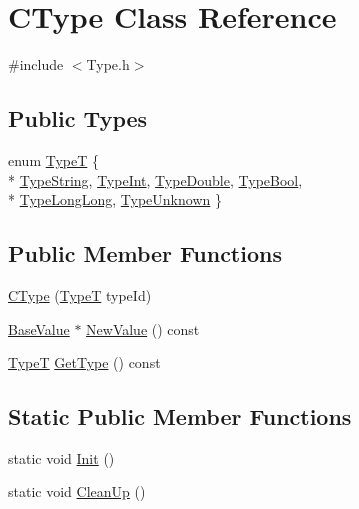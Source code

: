 \hypertarget{class_c_type}{}\section{C\+Type Class Reference}
\label{class_c_type}


{\ttfamily \#include $<$Type.\+h$>$}

\subsection*{Public Types}
\begin{DoxyCompactItemize}
\item 
enum \hyperlink{class_c_type_accfff8ca293dba5cbd8a2d677cf6afa8}{Type\+T} \{ \\*
\hyperlink{class_c_type_accfff8ca293dba5cbd8a2d677cf6afa8a32dc6836df63bbf4807060e818f3da44}{Type\+String}, 
\hyperlink{class_c_type_accfff8ca293dba5cbd8a2d677cf6afa8a874281da0d6532ec4227d4da1fa76af6}{Type\+Int}, 
\hyperlink{class_c_type_accfff8ca293dba5cbd8a2d677cf6afa8a49eebda7b46165589876f59f2afd97f3}{Type\+Double}, 
\hyperlink{class_c_type_accfff8ca293dba5cbd8a2d677cf6afa8a1606018c0364dff12aa35ffb5d8a3bca}{Type\+Bool}, 
\\*
\hyperlink{class_c_type_accfff8ca293dba5cbd8a2d677cf6afa8adf9dba82ab56f4fe11cc370139e69243}{Type\+Long\+Long}, 
\hyperlink{class_c_type_accfff8ca293dba5cbd8a2d677cf6afa8a3b3c7e2f3e8940bf90120c5344062e60}{Type\+Unknown}
 \}
\end{DoxyCompactItemize}
\subsection*{Public Member Functions}
\begin{DoxyCompactItemize}
\item 
\hyperlink{class_c_type_aed801f1b3e3660cfadd9897a4afa1824}{C\+Type} (\hyperlink{class_c_type_accfff8ca293dba5cbd8a2d677cf6afa8}{Type\+T} type\+Id)
\item 
\hyperlink{class_base_value}{Base\+Value} $\ast$ \hyperlink{class_c_type_ab1ae84c699e62bc093649ef3df8f88d4}{New\+Value} () const 
\item 
\hyperlink{class_c_type_accfff8ca293dba5cbd8a2d677cf6afa8}{Type\+T} \hyperlink{class_c_type_afb30438759d5eac237c0015721123aff}{Get\+Type} () const 
\end{DoxyCompactItemize}
\subsection*{Static Public Member Functions}
\begin{DoxyCompactItemize}
\item 
static void \hyperlink{class_c_type_a300391a468acd27b97b48c960977a0c7}{Init} ()
\item 
static void \hyperlink{class_c_type_add9813182e3e1943141e5838d815ff34}{Clean\+Up} ()
\end{DoxyCompactItemize}


